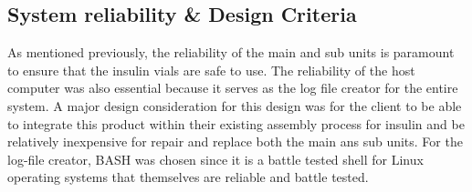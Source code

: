 \subsection{System reliability \& Design Criteria}
As mentioned previously, the reliability of the main and sub units is paramount to ensure that the insulin vials are safe to use. The reliability of the host computer was also essential because it serves as the log file creator for the entire system. A major design consideration for this design was for the client to be able to integrate this product within their existing assembly process for insulin and be relatively inexpensive for repair and replace both the main ans sub units. For the log-file creator, BASH was chosen since it is a battle tested shell for Linux operating systems that themselves are reliable and battle tested.
\begin{landscape}

\end{landscape}
